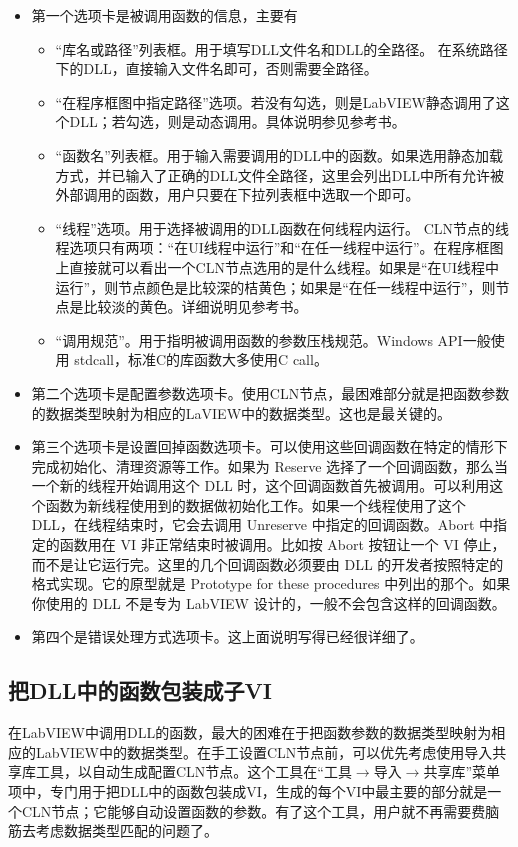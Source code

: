 \begin{itemize}
\item 第一个选项卡是被调用函数的信息，主要有
\begin{itemize}
\item “库名或路径”列表框。用于填写DLL文件名和DLL的全路径。 在系统路径下的DLL，直接输入文件名即可，否则需要全路径。
\item “在程序框图中指定路径”选项。若没有勾选，则是LabVIEW静态调用了这个DLL；若勾选，则是动态调用。具体说明参见参考书。
\item “函数名”列表框。用于输入需要调用的DLL中的函数。如果选用静态加载方式，并已输入了正确的DLL文件全路径，这里会列出DLL中所有允许被外部调用的函数，用户只要在下拉列表框中选取一个即可。
\item “线程”选项。用于选择被调用的DLL函数在何线程内运行。 CLN节点的线程选项只有两项：“在UI线程中运行”和“在任一线程中运行”。在程序框图上直接就可以看出一个CLN节点选用的是什么线程。如果是“在UI线程中运行”，则节点颜色是比较深的桔黄色；如果是“在任一线程中运行”，则节点是比较淡的黄色。详细说明见参考书。
\item “调用规范”。用于指明被调用函数的参数压栈规范。Windows API一般使用 stdcall，标准C的库函数大多使用C call。
\end{itemize}
\item 第二个选项卡是配置参数选项卡。使用CLN节点，最困难部分就是把函数参数的数据类型映射为相应的LaVIEW中的数据类型。这也是最关键的。
\item 第三个选项卡是设置回掉函数选项卡。可以使用这些回调函数在特定的情形下完成初始化、清理资源等工作。如果为 Reserve 选择了一个回调函数，那么当一个新的线程开始调用这个 DLL 时，这个回调函数首先被调用。可以利用这个函数为新线程使用到的数据做初始化工作。如果一个线程使用了这个 DLL，在线程结束时，它会去调用 Unreserve 中指定的回调函数。Abort 中指定的函数用在 VI 非正常结束时被调用。比如按 Abort 按钮让一个 VI 停止，而不是让它运行完。这里的几个回调函数必须要由 DLL 的开发者按照特定的格式实现。它的原型就是 Prototype for these procedures 中列出的那个。如果你使用的 DLL 不是专为 LabVIEW 设计的，一般不会包含这样的回调函数。
\item 第四个是错误处理方式选项卡。这上面说明写得已经很详细了。
\end{itemize}





\subsection{把DLL中的函数包装成子VI}
在LabVIEW中调用DLL的函数，最大的困难在于把函数参数的数据类型映射为相应的LabVIEW中的数据类型。在手工设置CLN节点前，可以优先考虑使用导入共享库工具，以自动生成配置CLN节点。这个工具在“工具$\rightarrow$导入$\rightarrow$共享库”菜单项中，专门用于把DLL中的函数包装成VI，生成的每个VI中最主要的部分就是一个CLN节点；它能够自动设置函数的参数。有了这个工具，用户就不再需要费脑筋去考虑数据类型匹配的问题了。

